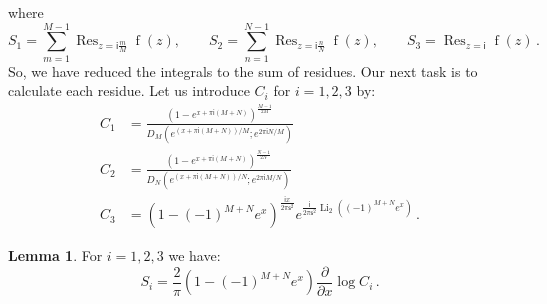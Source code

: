\documentclass[12pt]{amsart}
\theoremstyle{definition}
\newtheorem{lemma}[theorem]{Lemma}
\newcommand{\im}{\mathsf{i}}
\begin{document}
where 
$$
S_1 = \sum_{m=1}^{M-1}\operatorname{Res}_{z=\im \frac mM} 
\operatorname{f}(z), \qquad
S_2 = \sum_{n=1}^{N-1}\operatorname{Res}_{z=\im \frac nN}
\operatorname{f}(z), \qquad
S_3 = \operatorname{Res}_{z=\im}
\operatorname{f}(z) \,.
$$
So, we have reduced the integrals to the sum of residues. Our next task is
to calculate each residue. Let us introduce $C_i$ for $i=1,2,3$ by:
\begin{align*}
C_1 &=\frac{\left(1-e^{x+\pi\im(M+N)}\right)^{\frac{M-1}{2M}}}{
D_M\left(e^{(x+\pi\im(M+N))/M}; e^{2\pi \im  N/M}\right)} \\
C_2 &=\frac{\left(1-e^{x+\pi\im(M+N)}\right)^{\frac{N-1}{2N}}}{
D_N\left(e^{(x+\pi\im(M+N))/N}; e^{2\pi \im  M/N}\right)} \\
C_3 &=\left(1-(-1)^{M+N}e^x\right)^{\frac{\im x}{2\pi\mathsf{s}^2}} 
e^{\frac{\im}{2\pi\mathsf{s}^2}\operatorname{Li}_2\left((-1)^{M+N}e^x\right)} \,.
\end{align*}

\begin{lemma}
\label{lem.SC}
For $i=1,2,3$ we have:
\begin{equation}
\label{eq.SC}
S_i = \frac{2}{\pi}\left(1-(-1)^{M+N} e^{x}\right)
\frac{\partial}{\partial x} \log C_i \,.
\end{equation}
\end{lemma}
\end{document}

